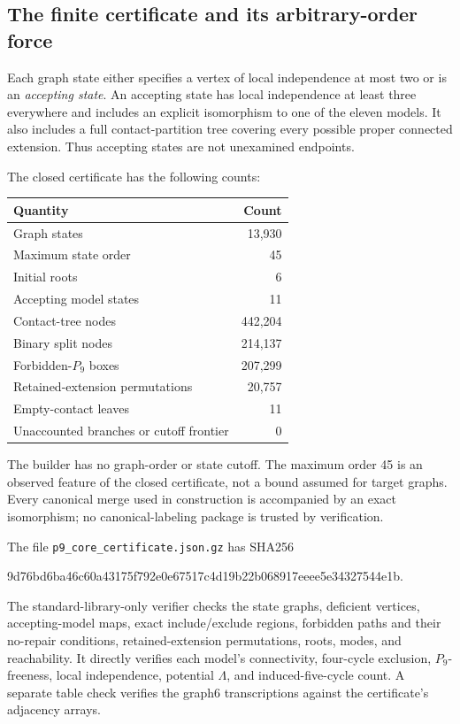 \documentclass[11pt,a4paper]{article}
\theoremstyle{definition}\newtheorem{definition}[theorem]{Definition}
\theoremstyle{remark}\newtheorem{remark}[theorem]{Remark}
\begin{document}
\subsection{The finite certificate and its arbitrary-order force}
Each graph state either specifies a vertex of local independence at
most two or is an \emph{accepting state}. An accepting state has local
independence at least three everywhere and includes an explicit
isomorphism to one of the eleven models. It also includes a full
contact-partition tree covering every possible proper connected
extension. Thus accepting states are not unexamined endpoints.

The closed certificate has the following counts:
\begin{center}
\begin{tabular}{lr}
\toprule
Quantity&Count\\\midrule
Graph states&13,930\\
Maximum state order&45\\
Initial roots&6\\
Accepting model states&11\\
Contact-tree nodes&442,204\\
Binary split nodes&214,137\\
Forbidden-$P_9$ boxes&207,299\\
Retained-extension permutations&20,757\\
Empty-contact leaves&11\\
Unaccounted branches or cutoff frontier&0\\\bottomrule
\end{tabular}
\end{center}
The builder has no graph-order or state cutoff. The maximum order 45
is an observed feature of the closed certificate, not a bound assumed
for target graphs. Every canonical merge used in construction is
accompanied by an exact isomorphism; no canonical-labeling package is
trusted by verification.

The file \texttt{p9\_core\_certificate.json.gz} has SHA256
\begin{center}\small\ttfamily
9d76bd6ba46c60a43175f792e0e67517c4d19b22b068917eeee5e34327544e1b.
\end{center}
The standard-library-only verifier checks the state graphs, deficient
vertices, accepting-model maps, exact include/exclude regions,
forbidden paths and their no-repair conditions, retained-extension
permutations, roots, modes, and reachability. It directly verifies each
model's connectivity, four-cycle exclusion, $P_9$-freeness, local
independence, potential $\Lambda$, and induced-five-cycle count.
A separate table check verifies the graph6 transcriptions against the
certificate's adjacency arrays.
\end{document}
